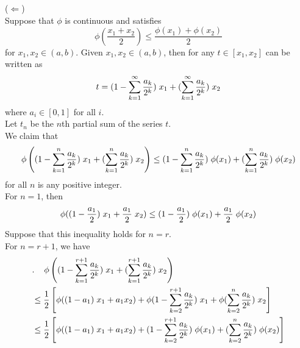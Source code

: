 \documentclass[a4paper,11pt]{article}
\begin{document}
\begin{enumerate}
 		($\Leftarrow$)\\
 		Suppose that $\phi$ is continuous and satisfies
 		$$\phi \left( \frac{x_1 + x_2}{2} \right) \leq \frac{\phi(x_1) + \phi(x_2)}{2}$$
 		for $x_1, x_2 \in (a,b)$.
 		Given $x_1, x_2 \in (a,b)$, then for any $t \in [x_1, x_2]$ can be written as
 		$$t = (1 - \sum_{k=1}^\infty \frac{a_k}{2^k}) \hspace{0.1cm} x_1 + (\sum_{k=1}^\infty \frac{a_k}{2^k}) \hspace{0.1cm} x_2$$
 		where $a_i \in [0,1]$ for all $i$.\\
 		Let $t_n$ be the $n$th partial sum of the series $t$.\\
 		We claim that
 		$$\phi\left( (1 - \sum_{k=1}^n \frac{a_k}{2^k}) \hspace{0.1cm} x_1 + (\sum_{k=1}^n \frac{a_k}{2^k}) \hspace{0.1cm} x_2 \right)
 		\leq (1 - \sum_{k=1}^n \frac{a_k}{2^k}) \hspace{0.1cm} \phi(x_1) + (\sum_{k=1}^n \frac{a_k}{2^k}) \hspace{0.1cm} \phi(x_2)$$
 		for all $n$ is any positive integer.\\
 		For $n = 1$, then
 		$$\phi((1 - \frac{a_1}{2}) \hspace{0.1cm} x_1 + \frac{a_1}{2} \hspace{0.1cm} x_2)
 		\leq (1 - \frac{a_1}{2}) \hspace{0.1cm} \phi(x_1) + \frac{a_1}{2} \hspace{0.1cm} \phi(x_2)$$
 		Suppose that this inequality holds for $n = r$.\\
 		For $n = r + 1$, we have
 		$$\begin{aligned}
 		&.\hspace{0.4cm} \phi\left( (1 - \sum_{k=1}^{r+1} \frac{a_k}{2^k}) \hspace{0.1cm} x_1 + (\sum_{k=1}^{r+1} \frac{a_k}{2^k}) \hspace{0.1cm} x_2 \right)\\
 		&\leq \frac{1}{2} \left[ \phi((1 - a_1) \hspace{0.1cm} x_1 + a_1 x_2) + \phi (1 - \sum_{k=2}^{r+1} \frac{a_k}{2^k}) \hspace{0.1cm} x_1 + \phi (\sum_{k=2}^n \frac{a_k}{2^k}) \hspace{0.1cm} x_2 \right]\\
 		&\leq \frac{1}{2} \left[ \phi((1 - a_1) \hspace{0.1cm} x_1 + a_1 x_2) + (1 - \sum_{k=2}^{r+1} \frac{a_k}{2^k}) \hspace{0.1cm} \phi(x_1) + (\sum_{k=2}^n \frac{a_k}{2^k}) \hspace{0.1cm} \phi(x_2) \right]\\

\end{aligned}$$
\end{enumerate}
\end{document}
